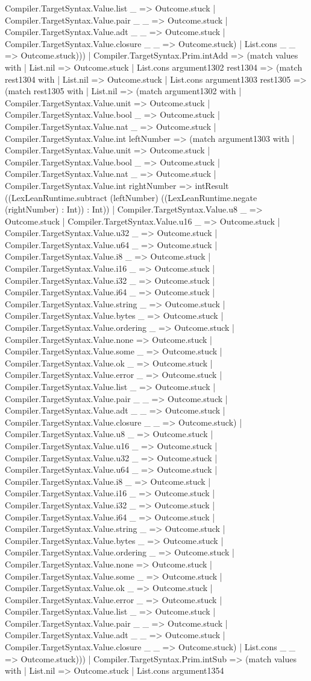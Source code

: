 \documentclass[11pt]{article}
\begin{document}
Compiler.TargetSyntax.Value.list \_ => Outcome.stuck | Compiler.TargetSyntax.Value.pair \_ \_ => Outcome.stuck | Compiler.TargetSyntax.Value.adt \_ \_ => Outcome.stuck | Compiler.TargetSyntax.Value.closure \_ \_ => Outcome.stuck) | List.cons \_ \_ => Outcome.stuck))) | Compiler.TargetSyntax.Prim.intAdd => (match values with | List.nil => Outcome.stuck | List.cons argument1302 rest1304 => (match rest1304 with | List.nil => Outcome.stuck | List.cons argument1303 rest1305 => (match rest1305 with | List.nil => (match argument1302 with | Compiler.TargetSyntax.Value.unit => Outcome.stuck | Compiler.TargetSyntax.Value.bool \_ => Outcome.stuck | Compiler.TargetSyntax.Value.nat \_ => Outcome.stuck | Compiler.TargetSyntax.Value.int leftNumber => (match argument1303 with | Compiler.TargetSyntax.Value.unit => Outcome.stuck | Compiler.TargetSyntax.Value.bool \_ => Outcome.stuck | Compiler.TargetSyntax.Value.nat \_ => Outcome.stuck | Compiler.TargetSyntax.Value.int rightNumber => intResult ((LexLeanRuntime.subtract (leftNumber) ((LexLeanRuntime.negate (rightNumber) : Int)) : Int)) | Compiler.TargetSyntax.Value.u8 \_ => Outcome.stuck | Compiler.TargetSyntax.Value.u16 \_ => Outcome.stuck | Compiler.TargetSyntax.Value.u32 \_ => Outcome.stuck | Compiler.TargetSyntax.Value.u64 \_ => Outcome.stuck | Compiler.TargetSyntax.Value.i8 \_ => Outcome.stuck | Compiler.TargetSyntax.Value.i16 \_ => Outcome.stuck | Compiler.TargetSyntax.Value.i32 \_ => Outcome.stuck | Compiler.TargetSyntax.Value.i64 \_ => Outcome.stuck | Compiler.TargetSyntax.Value.string \_ => Outcome.stuck | Compiler.TargetSyntax.Value.bytes \_ => Outcome.stuck | Compiler.TargetSyntax.Value.ordering \_ => Outcome.stuck | Compiler.TargetSyntax.Value.none => Outcome.stuck | Compiler.TargetSyntax.Value.some \_ => Outcome.stuck | Compiler.TargetSyntax.Value.ok \_ => Outcome.stuck | Compiler.TargetSyntax.Value.error \_ => Outcome.stuck | Compiler.TargetSyntax.Value.list \_ => Outcome.stuck | Compiler.TargetSyntax.Value.pair \_ \_ => Outcome.stuck | Compiler.TargetSyntax.Value.adt \_ \_ => Outcome.stuck | Compiler.TargetSyntax.Value.closure \_ \_ => Outcome.stuck) | Compiler.TargetSyntax.Value.u8 \_ => Outcome.stuck | Compiler.TargetSyntax.Value.u16 \_ => Outcome.stuck | Compiler.TargetSyntax.Value.u32 \_ => Outcome.stuck | Compiler.TargetSyntax.Value.u64 \_ => Outcome.stuck | Compiler.TargetSyntax.Value.i8 \_ => Outcome.stuck | Compiler.TargetSyntax.Value.i16 \_ => Outcome.stuck | Compiler.TargetSyntax.Value.i32 \_ => Outcome.stuck | Compiler.TargetSyntax.Value.i64 \_ => Outcome.stuck | Compiler.TargetSyntax.Value.string \_ => Outcome.stuck | Compiler.TargetSyntax.Value.bytes \_ => Outcome.stuck | Compiler.TargetSyntax.Value.ordering \_ => Outcome.stuck | Compiler.TargetSyntax.Value.none => Outcome.stuck | Compiler.TargetSyntax.Value.some \_ => Outcome.stuck | Compiler.TargetSyntax.Value.ok \_ => Outcome.stuck | Compiler.TargetSyntax.Value.error \_ => Outcome.stuck | Compiler.TargetSyntax.Value.list \_ => Outcome.stuck | Compiler.TargetSyntax.Value.pair \_ \_ => Outcome.stuck | Compiler.TargetSyntax.Value.adt \_ \_ => Outcome.stuck | Compiler.TargetSyntax.Value.closure \_ \_ => Outcome.stuck) | List.cons \_ \_ => Outcome.stuck))) | Compiler.TargetSyntax.Prim.intSub => (match values with | List.nil => Outcome.stuck | List.cons argument1354 
\end{document}
